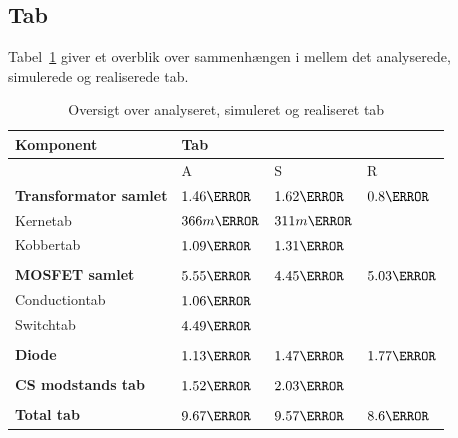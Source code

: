 \subsection{Tab}
Tabel~\ref{tab:realisering_tab} giver et overblik over sammenhængen i mellem det analyserede, simulerede og realiserede tab.
\begin{table}[H] 			
	\centering
	\begin{tabularx}{\textwidth}{|X|l|l|l|}
		\hline
		\textbf{\large Komponent} & \multicolumn{3}{|l|}{\textbf{\large Tab}} \\ \hline
		& A & S	& R\\ \hline
		\textbf{Transformator samlet} & $1.46\watt$ & $1.62\watt$ & $0.8\watt$\\ \hline 
		Kernetab & $366m\watt$ & $311m\watt$ &  \\ \hline
		Kobbertab & $1.09\watt$ & $1.31\watt$ & \\ \hline
		& &	& \\ \hline
		\textbf{MOSFET samlet} & $5.55\watt$ & $4.45\watt$ & $5.03\watt$\\ \hline
		Conductiontab & $1.06\watt$ & & \\ \hline
		Switchtab & $4.49\watt$ &  &    \\ \hline
		& &	& \\ \hline
		\textbf{Diode} & $1.13\watt$ & $1.47\watt$ & $1.77\watt$\\ \hline
		& &	& \\ \hline
		\textbf{CS modstands tab} & $1.52\watt$ & $2.03\watt$ & \\ \hline
		& &	& \\ \hline
		\textbf{Total tab} & $9.67\watt$ & $9.57\watt$ & $8.6\watt$\\ \hline
	\end{tabularx}
	\caption{Oversigt over analyseret, simuleret og realiseret tab}
	\label{tab:realisering_tab}
\end{table}